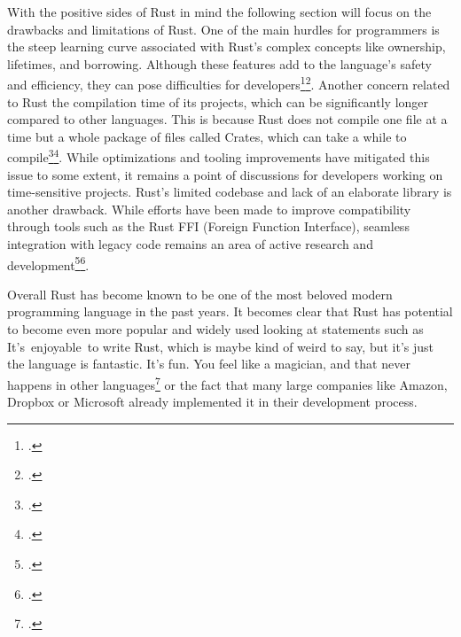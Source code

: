 With the positive sides of Rust in mind the following section will focus on the drawbacks and limitations of Rust. One of the main hurdles for programmers is the steep learning curve associated with Rust's complex concepts like ownership, lifetimes, and borrowing. Although these features add to the language's safety and efficiency, they can pose difficulties for developers\footcite{mukul_downsides_nodate}\footcite{burkart_pros_2023}.
Another concern related to Rust the compilation time of its projects, which can be significantly longer compared to other languages. This is because Rust does not compile one file at a time but a whole package of files called \dq Crates\dq, which can take a while to compile\footcite{mukul_downsides_nodate}\footcite{burkart_pros_2023}. While optimizations and tooling improvements have mitigated this issue to some extent, it remains a point of discussions for developers working on time-sensitive projects.
Rust's limited codebase and lack of an elaborate library is another drawback. While efforts have been made to improve compatibility through tools such as the Rust FFI (Foreign Function Interface), seamless integration with legacy code remains an area of active research and development\footcite{mukul_downsides_nodate}\footcite{burkart_pros_2023}.

Overall Rust has become known to be one of the most beloved modern programming language in the past years. It becomes clear that Rust has potential to become even more popular and widely used looking at statements such as 
\dq It’s enjoyable to write Rust, which is maybe kind of weird to say, but it’s just the language is fantastic. It’s fun. You feel like a magician, and that never happens in other languages\dq\footcite{thompson_how_nodate} or the fact that many large companies like Amazon, Dropbox or Microsoft already implemented it in their development process.